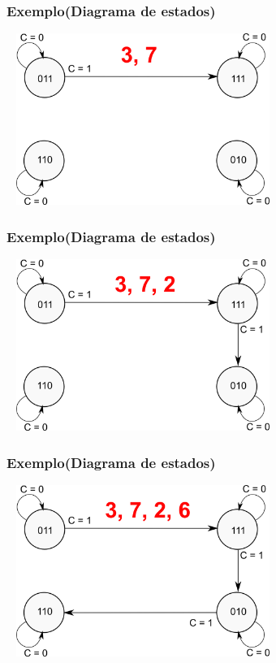 \documentclass{beamer}
\begin{document}
\begin{frame}
  \frametitle{Exemplo(Diagrama de estados)}
  \begin{center}
    \includegraphics[height = 2.2in, width = 3.5in]{exemplo_projeto_2.png}
  \end{center}
\end{frame}

\begin{frame}
  \frametitle{Exemplo(Diagrama de estados)}
  \begin{center}
    \includegraphics[height = 2.2in, width = 3.5in]{exemplo_projeto_3.png}
  \end{center}
\end{frame}

\begin{frame}
  \frametitle{Exemplo(Diagrama de estados)}
  \begin{center}
    \includegraphics[height = 2.2in, width = 3.5in]{exemplo_projeto_4.png}
  \end{center}
\end{frame}
\end{document}
